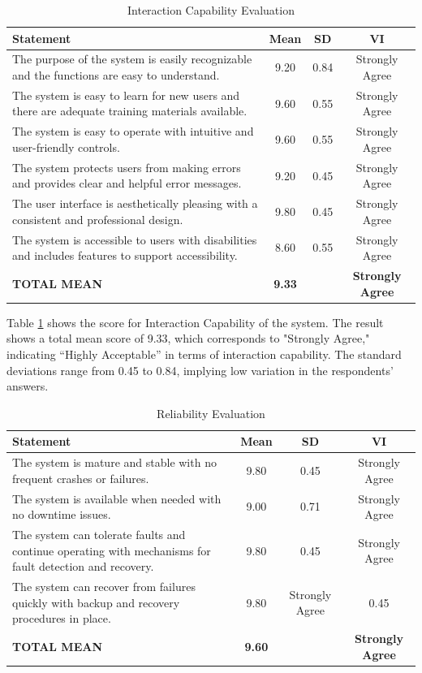 	
	\begin{table}[h!]
		\centering
		\caption{Interaction Capability Evaluation}
		\label{intcap}
		\renewcommand{\arraystretch}{1.2}
		\begin{tabularx}{\linewidth}{|X|c|c|c|}
			\hline
			\textbf{Statement} & \textbf{Mean} & \textbf{SD} & \textbf{VI} \\ \hline
			The purpose of the system is easily recognizable and the functions are easy to understand.
			& 9.20 & 0.84 & Strongly Agree \\ \hline
			The system is easy to learn for new users and there are adequate training materials available.
			& 9.60 & 0.55 & Strongly Agree \\ \hline
			The system is easy to operate with intuitive and user-friendly controls.
			& 9.60 & 0.55 & Strongly Agree \\ \hline
			The system protects users from making errors and provides clear and helpful error messages.
			& 9.20 & 0.45 & Strongly Agree \\ \hline
			The user interface is aesthetically pleasing with a consistent and professional design.
			& 9.80 & 0.45 & Strongly Agree \\ \hline
			The system is accessible to users with disabilities and includes features to support accessibility.
			& 8.60 & 0.55 & Strongly Agree \\ \hline
			\textbf{TOTAL MEAN} & \textbf{9.33} & & \textbf{Strongly Agree} \\ \hline
		\end{tabularx}
	\end{table}
	
	Table \ref{intcap} shows the score for Interaction Capability of the system. The result shows a total mean score of 9.33, which corresponds to "Strongly Agree," indicating “Highly Acceptable” in terms of interaction capability. The standard deviations range from 0.45 to 0.84, implying low variation in the respondents’ answers.
	
	\begin{table}[h!]
		\centering
		\caption{Reliability Evaluation}
		\label{relblty}
		\renewcommand{\arraystretch}{1.2}
		\begin{tabularx}{\linewidth}{|X|c|c|c|}
			\hline
			\textbf{Statement} & \textbf{Mean} & \textbf{SD} & \textbf{VI} \\ \hline
			The system is mature and stable with no frequent crashes or failures.
			& 9.80 & 0.45 & Strongly Agree \\ \hline
			The system is available when needed with no downtime issues.
			& 9.00 & 0.71 & Strongly Agree \\ \hline
			The system can tolerate faults and continue operating with mechanisms for fault detection and recovery.
			& 9.80 & 0.45 & Strongly Agree \\ \hline
			The system can recover from failures quickly with backup and recovery procedures in place.
			& 9.80 & Strongly Agree & 0.45\\ \hline
			\textbf{TOTAL MEAN} & \textbf{9.60} & & \textbf{Strongly Agree} \\ \hline
		\end{tabularx}
	\end{table}
	
